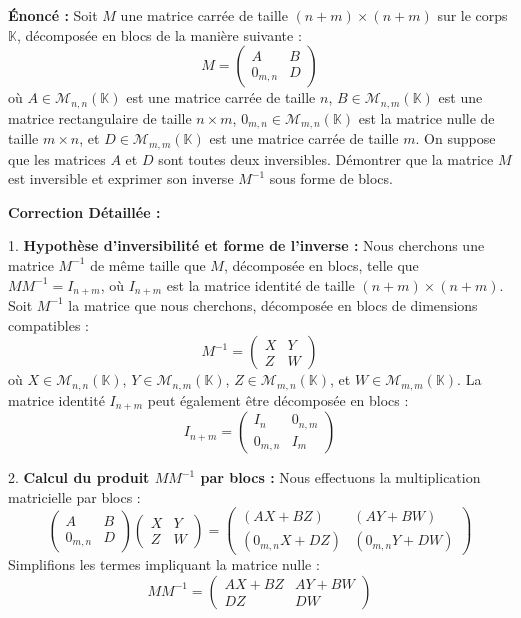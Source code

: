 \documentclass{report}
\begin{document}
\textbf{Énoncé :}
Soit $M$ une matrice carrée de taille $(n+m) \times (n+m)$ sur le corps $\mathbb{K}$, décomposée en blocs de la manière suivante :
$$M = \begin{pmatrix} A & B \\ 0_{m,n} & D \end{pmatrix}$$
où $A \in \mathcal{M}_{n,n}(\mathbb{K})$ est une matrice carrée de taille $n$, $B \in \mathcal{M}_{n,m}(\mathbb{K})$ est une matrice rectangulaire de taille $n \times m$, $0_{m,n} \in \mathcal{M}_{m,n}(\mathbb{K})$ est la matrice nulle de taille $m \times n$, et $D \in \mathcal{M}_{m,m}(\mathbb{K})$ est une matrice carrée de taille $m$.
On suppose que les matrices $A$ et $D$ sont toutes deux inversibles.
Démontrer que la matrice $M$ est inversible et exprimer son inverse $M^{-1}$ sous forme de blocs.

\textbf{Correction Détaillée :}

1.  \textbf{Hypothèse d'inversibilité et forme de l'inverse :}
    Nous cherchons une matrice $M^{-1}$ de même taille que $M$, décomposée en blocs, telle que $M M^{-1} = I_{n+m}$, où $I_{n+m}$ est la matrice identité de taille $(n+m) \times (n+m)$.
    Soit $M^{-1}$ la matrice que nous cherchons, décomposée en blocs de dimensions compatibles :
    $$M^{-1} = \begin{pmatrix} X & Y \\ Z & W \end{pmatrix}$$
    où $X \in \mathcal{M}_{n,n}(\mathbb{K})$, $Y \in \mathcal{M}_{n,m}(\mathbb{K})$, $Z \in \mathcal{M}_{m,n}(\mathbb{K})$, et $W \in \mathcal{M}_{m,m}(\mathbb{K})$.
    La matrice identité $I_{n+m}$ peut également être décomposée en blocs :
    $$I_{n+m} = \begin{pmatrix} I_n & 0_{n,m} \\ 0_{m,n} & I_m \end{pmatrix}$$

2.  \textbf{Calcul du produit $M M^{-1}$ par blocs :}
    Nous effectuons la multiplication matricielle par blocs :
    $$\begin{pmatrix} A & B \\ 0_{m,n} & D \end{pmatrix} \begin{pmatrix} X & Y \\ Z & W \end{pmatrix} = \begin{pmatrix} (A X + B Z) & (A Y + B W) \\ (0_{m,n} X + D Z) & (0_{m,n} Y + D W) \end{pmatrix}$$
    Simplifions les termes impliquant la matrice nulle :
    $$M M^{-1} = \begin{pmatrix} A X + B Z & A Y + B W \\ D Z & D W \end{pmatrix}$$
\end{document}
